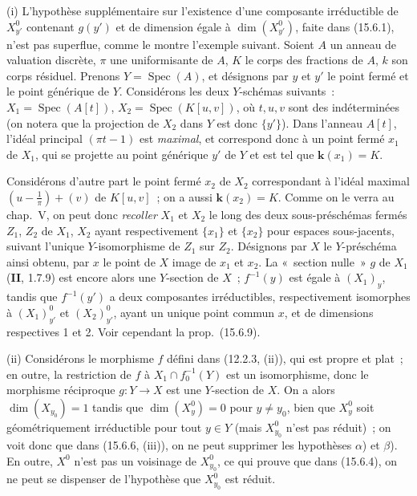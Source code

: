 \begin{remarks}[15.6.10]
(i) L'hypothèse supplémentaire sur l'existence d'une composante irréductible de $X_{y'}^0$ contenant $g(y')$ et de dimension égale à $\dim(X_{y'}^0)$, faite dans (15.6.1), n'est pas superflue, comme le montre l'exemple suivant. Soient $A$ un anneau de valuation discrète, $\pi$ une uniformisante de $A$, $K$ le corps des fractions de $A$, $k$ son corps résiduel. Prenons $Y=\operatorname{Spec}(A)$, et désignons par $y$ et $y'$ le point fermé et le point générique de $Y$. Considérons les deux $Y$-schémas suivants~: $X_1=\operatorname{Spec}(A[t])$, $X_2=\operatorname{Spec}(K[u,v])$, où $t,u,v$ sont des indéterminées (on notera que la projection de $X_2$ dans $Y$ est donc $\{y'\}$). Dans l'anneau $A[t]$, l'idéal principal $(\pi t-1)$ est \emph{maximal}, et correspond donc à un point fermé $x_1$ de $X_1$, qui se projette au point générique $y'$ de $Y$ et est tel que $\mathbf{k}(x_1)=K$.

Considérons d'autre part le point fermé $x_2$ de $X_2$ correspondant à l'idéal maximal $\left(u-\frac{1}{\pi}\right)+(v)$ de $K[u,v]$~; on a aussi $\mathbf{k}(x_2)=K$. Comme on le verra au chap.~V, on peut donc \emph{recoller} $X_1$ et $X_2$ le long des deux sous-préschémas fermés $Z_1$, $Z_2$ de $X_1$, $X_2$ ayant respectivement $\{x_1\}$ et $\{x_2\}$ pour espaces sous-jacents, suivant l'unique $Y$-isomorphisme de $Z_1$ sur $Z_2$. Désignons par $X$ le $Y$-préschéma ainsi obtenu, par $x$ le point de $X$ image de $x_1$ et $x_2$. La «~section nulle~» $g$ de $X_1$ (\textbf{II}, 1.7.9) est encore alors une $Y$-section de $X$~; $f^{-1}(y)$ est égale à $(X_1)_y$, tandis que $f^{-1}(y')$ a deux composantes irréductibles, respectivement isomorphes à $(X_1)_{y'}^0$ et $(X_2)_{y'}^0$, ayant un unique point commun $x$, et de dimensions respectives 1 et 2. Voir cependant la prop.~(15.6.9).

(ii) Considérons le morphisme $f$ défini dans (12.2.3, (ii)), qui est propre et plat~; en outre, la restriction de $f$ à $X_1\cap f_0^{-1}(Y)$ est un isomorphisme, donc le morphisme réciproque $g:Y\to X$ est une $Y$-section de $X$. On a alors $\dim(X_{y_0})=1$ tandis que $\dim(X_y^0)=0$ pour $y\ne y_0$, bien que $X_y^0$ soit géométriquement irréductible pour tout $y\in Y$ (mais $X_{y_0}^0$ n'est pas réduit)~; on voit donc que dans (15.6.6, (iii)), on ne peut supprimer les hypothèses $\alpha$) et $\beta$). En outre, $X^0$ n'est pas un voisinage de $X_{y_0}^{0}$, ce qui prouve que dans (15.6.4), on ne peut se dispenser de l'hypothèse que $X_{y_0}^0$ est réduit.


\end{remarks}
